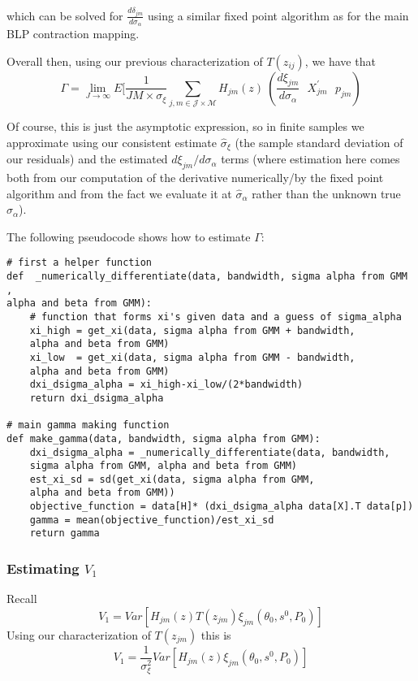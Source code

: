 \documentclass{article}
\begin{document}
\begin{enumerate}
\begin{enumerate}
\begin{answer}
which can be solved for $\frac{d \delta_{jm}}{d \sigma_\alpha}$ using a similar fixed point algorithm as for the main BLP contraction mapping. 


Overall then, using our previous characterization of $T(z_{ij})$, we have that  $$\Gamma= \lim_{J \to \infty} E[\frac{1}{JM \times \sigma_\xi} \sum_{j,m\in\mathcal{J}\times \mathcal{M}}H_{jm}(z) \
(\frac{d\xi_{jm}}{d\sigma_\alpha} \:\:\: X_{jm}^\prime \:\:\:p_{jm})$$

Of course, this is just the asymptotic expression, so in finite samples we approximate using our consistent estimate $\hat{\sigma}_\xi$ (the sample standard deviation of our residuals) and the estimated $d\xi_{jm}/d\sigma_\alpha$ terms (where estimation here comes both from our computation of the derivative numerically/by the  fixed point algorithm and from the fact we evaluate it at $\hat{\sigma}_{\alpha}$ rather than the unknown true $\sigma_\alpha$). 

The following pseudocode shows how to estimate $\Gamma$:


\begin{verbatim}
# first a helper function
def  _numerically_differentiate(data, bandwidth, sigma alpha from GMM ,
alpha and beta from GMM):
    # function that forms xi's given data and a guess of sigma_alpha 
    xi_high = get_xi(data, sigma alpha from GMM + bandwidth, 
    alpha and beta from GMM) 
    xi_low  = get_xi(data, sigma alpha from GMM - bandwidth, 
    alpha and beta from GMM) 
    dxi_dsigma_alpha = xi_high-xi_low/(2*bandwidth)
    return dxi_dsigma_alpha

# main gamma making function 
def make_gamma(data, bandwidth, sigma alpha from GMM):
    dxi_dsigma_alpha = _numerically_differentiate(data, bandwidth, 
    sigma alpha from GMM, alpha and beta from GMM)
    est_xi_sd = sd(get_xi(data, sigma alpha from GMM, 
    alpha and beta from GMM))
    objective_function = data[H]* (dxi_dsigma_alpha data[X].T data[p])
    gamma = mean(objective_function)/est_xi_sd
    return gamma
\end{verbatim}



\subsubsection*{Estimating $V_1$}
Recall $$V_1 = Var[H_{jm}(z)T(z_{jm})\xi_{jm}(\theta_0,s^0,P_0)]$$
Using our characterization of $T(z_{jm})$ this is 
 $$V_1 = \frac{1}{\sigma^2_\xi}Var[H_{jm}(z)\xi_{jm}(\theta_0,s^0,P_0)]$$


\end{answer}
\end{enumerate}
\end{enumerate}
\end{document}
